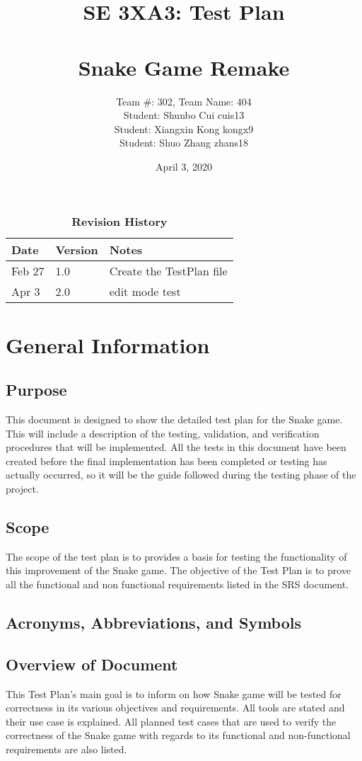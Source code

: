 \documentclass[12pt, titlepage]{article}
\title{SE 3XA3: Test Plan\\\\\textbf{Snake Game Remake}}
\author{Team \#: 302, Team Name: 404
		\\ Student: Shunbo Cui	cuis13
		\\ Student: Xiangxin Kong	kongx9
		\\ Student: Shuo Zhang	zhans18
}
\date{April 3, 2020}
\begin{document}
\maketitle

\tableofcontents
\listoftables
\listoffigures

\begin{table}[H]
\caption{\bf Revision History}
\begin{tabularx}{\textwidth}{p{3cm}p{2cm}X}
\toprule {\bf Date} & {\bf Version} & {\bf Notes}\\
\midrule
Feb 27 & 1.0 & Create the TestPlan file\\
Apr 3 & 2.0 & edit mode test\\
\bottomrule
\end{tabularx}
\end{table}



\newpage

\section{General Information}         

\subsection{Purpose}
This document is designed to show the detailed test plan for the Snake game. This will include a description of the testing, validation, and verification procedures that will be implemented. All the tests in this document have been created before the final implementation has been completed or testing has actually occurred, so it will be the guide followed during the testing phase of the project.

\subsection{Scope}
The scope of the test plan is to provides a basis for testing the functionality of this improvement of the Snake game. The objective of the Test Plan is to prove all the functional and non functional requirements listed in the SRS document.


\subsection{Acronyms, Abbreviations, and Symbols}


\subsection{Overview of Document}
This Test Plan's main goal is to inform on how Snake game will be tested for correctness in its various objectives and requirements. All tools are stated and their use case is explained. All planned test cases that are used to verify the correctness of the Snake game with regards to its functional and non-functional requirements are also listed.
\end{document}
